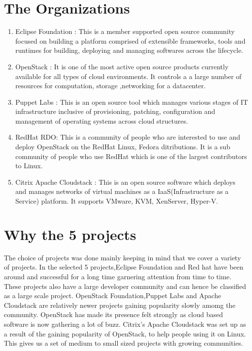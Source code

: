 \documentclass[seploa]{beavtex}
\begin{document}
\section{The Organizations}
\begin{enumerate}
\item Eclipse Foundation :
This is a member supported open source community focused on building a platform comprised of extensible frameworks, tools and runtimes for building, deploying and managing softwares across the lifecycle\cite{eclipse}.
\item OpenStack :
It is one of the most active open source products currently available for all types of cloud environments. It controls a a large number of resources for computation, storage ,networking for a datacenter\cite{openstack}.
\item Puppet Labs :
This is an open source tool which manages various stages of IT infrastructure inclusive of provisioning, patching, configuration and management of operating systems across cloud structures\cite{puppet}.
\item RedHat RDO:
This is a community of people who are interested to use and deploy OpenStack on the RedHat Linux, Fedora ditributions. It is a sub community of people who use RedHat which is one of the largest contributors to Linux\cite{rdo}.
\item Citrix Apache Cloudstack :
This is an open source software which deploys and manages networks of virtual machines as a IaaS(Infrastructure as a Service) platform. It supports VMware, KVM, XenServer, Hyper-V\cite{apache}.
\end{enumerate}

\section{Why the 5 projects}
The choice of projects was done mainly keeping in mind that we cover a variety of projects. In the selected 5 projects,Eclipse Foundation and Red hat have been around and successful for a long time garnering attention from time to time. These projects also have a large developer community and can hence be classified as a large scale project. OpenStack Foundation,Puppet Labs and Apache Cloudstack are relatively newer projects gaining popularity slowly amomg the community. OpenStack has made its presence felt strongly as cloud based software is now gathering a lot of buzz. Citrix's Apache Cloudstack was set up as a result of the gaining popularity of OpenStack, to help people using it on Linux. This gives us a set of medium to small sized projects with growing communities.
\end{document}
